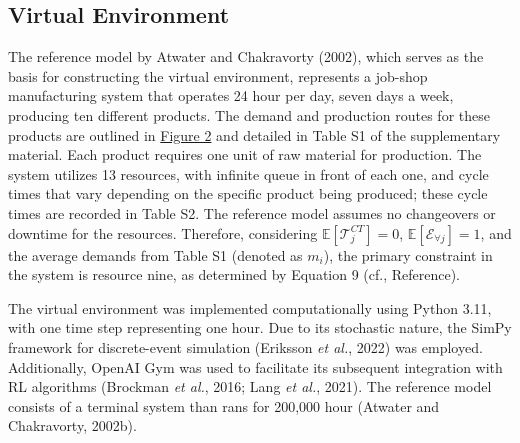 \subsection{\texorpdfstring{Virtual Environment
}{Virtual Environment }}\label{virtual-environment}

The reference model by Atwater and Chakravorty (\colorbox{yellow!40}{2002}), which serves
as the basis for constructing the virtual environment, represents a
job-shop manufacturing system that operates 24 hour per day, seven days
a week, producing ten different products. The demand and production
routes for these products are outlined in
\colorbox{yellow!40}{\hyperref[_Ref187516873]{Figure 2}} and detailed in Table S1 of the
supplementary material. Each product requires \colorbox{yellow!40}{one} unit of raw
material for production. The system utilizes 13 resources, with infinite
queue in front of each one, and cycle times that vary depending on the
specific product being produced; these cycle times are recorded in Table
S2. The reference model assumes no changeovers or downtime for the
resources. Therefore, considering
\(\mathbb{E}\left\lbrack \mathcal{T}_{j}^{CT} \right\rbrack = 0\),
\(\mathbb{E}\left\lbrack \mathcal{E}_{\forall j} \right\rbrack = 1\)\hspace{0pt}\hspace{0pt},
and the average demands from Table S1 (denoted as \(m_{i}\)), the
primary constraint in the system is resource nine, as determined by
Equation 9 (\colorbox{yellow!40}{cf., Reference}).

The virtual environment was implemented computationally using Python
3.11, with one time step representing one hour. Due to its stochastic
nature, the SimPy framework for discrete-event simulation (Eriksson
\emph{et al.}, 2022) was employed. Additionally, OpenAI Gym was used to
facilitate its subsequent integration with RL algorithms (Brockman
\emph{et al.}, 2016; Lang \emph{et al.}, 2021). The reference model
consists of a terminal system than rans for 200,000 hour (Atwater and
Chakravorty, 2002b).

